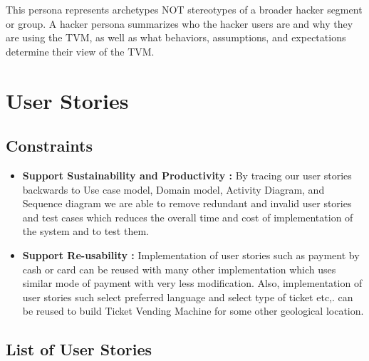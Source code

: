 \documentclass[15pt]{article}
\begin{document}
This persona represents archetypes NOT stereotypes of a broader hacker segment or group. A hacker persona summarizes who the hacker users are and why they are using the TVM, as well as what behaviors, assumptions, and expectations determine their view of the TVM.


\newpage
\section{\Large{User Stories}}

\subsection{\Large{Constraints}}
\begin{itemize}
    \item {\bfseries Support Sustainability and Productivity : } By tracing our user stories backwards to Use case model, Domain model, Activity Diagram, and Sequence diagram we are able to remove redundant and invalid user stories and test cases which reduces the overall time and cost of implementation of the system and to test them. \cite{calero2013towards}
    \item {\bfseries Support Re-usability : } Implementation of user stories such as payment by cash or card can be reused with many other implementation which uses similar mode of payment with very less modification. Also, implementation of user stories such select preferred language and select type of ticket etc,. can be reused to build Ticket Vending Machine for some other geological location. \cite{adams2015nonfunctional}
\end{itemize}

\newpage
\subsection{\Large{List of User Stories}}
\end{document}
